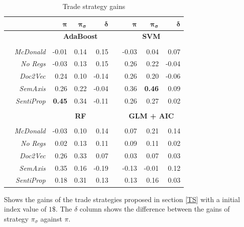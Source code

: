 \documentclass[a4paper, 12pt]{report}
\begin{document}
 \begin{table}[H]
    \setlength{\columnwidth}{1pt}
    \centering
    \begin{threeparttable}
   \begin{tabular}{rrrrrrrrr}
      \hline
     & & $\mathbf{\pi}$ & $\mathbf{\pi_\sigma}$ & $\mathbf{\delta}$ & & $\mathbf{\pi}$ & $\mathbf{\pi_\sigma}$ & $\mathbf{\delta}$ \\ 
      \midrule
      & & \multicolumn{3}{c}{\textbf{AdaBoost}} & & \multicolumn{3}{c}{\textbf{SVM}} \\
      \cmidrule{3-9}\\
      & \textit{McDonald} & -0.01 & 0.14 & 0.15 & & -0.03 & 0.04 & 0.07 \\ 
      & \textit{No Regs} & -0.03 & 0.13 & 0.15 & & 0.26 & 0.22 & -0.04  \\ 
      & \textit{Doc2Vec} & 0.24 & 0.10 & -0.14 & & 0.26 & 0.20 & -0.06 \\ 
      & \textit{SemAxis} & 0.26 & 0.22 & -0.04 & & 0.36 & \textbf{0.46} & 0.09  \\ 
      & \textit{SentiProp} & \textbf{0.45} & 0.34 & -0.11 & & 0.26 & 0.27 & 0.02 \\ 
      \multicolumn{8}{c}{} \\
      & & \multicolumn{3}{c}{\textbf{RF}} & & \multicolumn{3}{c}{\textbf{GLM + AIC}} \\
      \cmidrule{3-9}\\
       & \textit{McDonald} & -0.03 & 0.10 & 0.14 & & 0.07 & 0.21 & 0.14 \\ 
      & \textit{No Regs} & 0.02 & 0.13 & 0.11 & & 0.09 & 0.11 & 0.02  \\ 
      & \textit{Doc2Vec} & 0.26 & 0.33 & 0.07 & & 0.03 & 0.07 & 0.03 \\ 
      & \textit{SemAxis} & 0.35 & 0.16 & -0.19 & & -0.13 & -0.01 & 0.12\\ 
      & \textit{SentiProp} & 0.18 & 0.31 & 0.13 & & 0.13 & 0.16 & 0.03  \\ 
       \bottomrule
    \end{tabular}
    \begin{tablenotes}
      \footnotesize
      \item Shows the gains of the trade strategies proposed in section \ref{TS} with a initial index value of $1\$$. The $\delta$ column shows the difference between the gains of strategy $\pi_\sigma$ against $\pi$.  
    \end{tablenotes}
    \caption{Trade strategy gains}
    \label{Tab:Trade}
  \end{threeparttable}
    \end{table}
    
\end{document}
